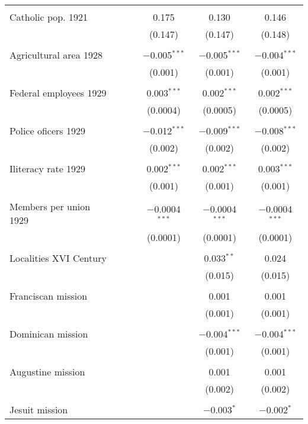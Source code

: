 \begin{table}[!htbp]
\begin{tabular}{@{\extracolsep{5pt}}lccccc}
  & & & & & \\ 
 Catholic pop. 1921 &  &  & 0.175 & 0.130 & 0.146 \\ 
  &  &  & (0.147) & (0.147) & (0.148) \\ 
  & & & & & \\ 
 Agricultural area 1928 &  &  & $-$0.005$^{***}$ & $-$0.005$^{***}$ & $-$0.004$^{***}$ \\ 
  &  &  & (0.001) & (0.001) & (0.001) \\ 
  & & & & & \\ 
 Federal employees 1929 &  &  & 0.003$^{***}$ & 0.002$^{***}$ & 0.002$^{***}$ \\ 
  &  &  & (0.0004) & (0.0005) & (0.0005) \\ 
  & & & & & \\ 
 Police oficers 1929 &  &  & $-$0.012$^{***}$ & $-$0.009$^{***}$ & $-$0.008$^{***}$ \\ 
  &  &  & (0.002) & (0.002) & (0.002) \\ 
  & & & & & \\ 
 Iliteracy rate 1929 &  &  & 0.002$^{***}$ & 0.002$^{***}$ & 0.003$^{***}$ \\ 
  &  &  & (0.001) & (0.001) & (0.001) \\ 
  & & & & & \\ 
 Members per union 1929 &  &  & $-$0.0004$^{***}$ & $-$0.0004$^{***}$ & $-$0.0004$^{***}$ \\ 
  &  &  & (0.0001) & (0.0001) & (0.0001) \\ 
  & & & & & \\ 
 Localities XVI Century &  &  &  & 0.033$^{**}$ & 0.024 \\ 
  &  &  &  & (0.015) & (0.015) \\ 
  & & & & & \\ 
 Franciscan mission &  &  &  & 0.001 & 0.001 \\ 
  &  &  &  & (0.001) & (0.001) \\ 
  & & & & & \\ 
 Dominican mission &  &  &  & $-$0.004$^{***}$ & $-$0.004$^{***}$ \\ 
  &  &  &  & (0.001) & (0.001) \\ 
  & & & & & \\ 
 Augustine mission &  &  &  & 0.001 & 0.001 \\ 
  &  &  &  & (0.002) & (0.002) \\ 
  & & & & & \\ 
 Jesuit mission &  &  &  & $-$0.003$^{*}$ & $-$0.002$^{*}$ \\ 

\end{tabular}
\end{table}
